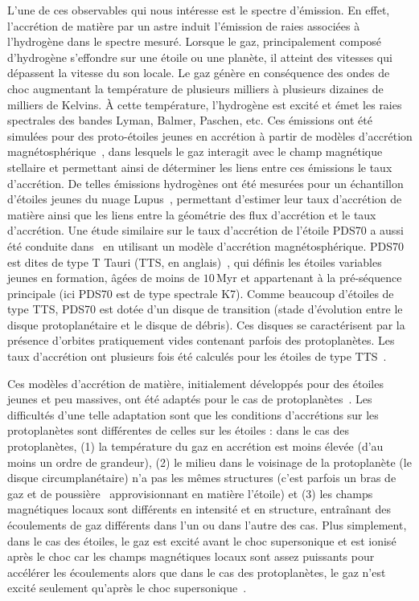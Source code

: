 L'une de ces observables qui nous intéresse est le spectre d'émission. En effet, l'accrétion de matière par un astre induit l'émission de raies associées à l'hydrogène dans le spectre mesuré. Lorsque le gaz, principalement composé d'hydrogène s'effondre sur une étoile ou une planète, il atteint des vitesses qui dépassent la vitesse du son locale. Le gaz génère en conséquence des ondes de choc augmentant la température de plusieurs milliers à plusieurs dizaines de milliers de Kelvins. À cette température, l'hydrogène est excité et émet les raies spectrales des bandes Lyman, Balmer, Paschen, etc. Ces émissions ont été simulées pour des proto-étoiles jeunes en accrétion à partir de modèles d'accrétion magnétosphérique~\citep{muzerolle2001, natta2004, espaillat2008}, dans lesquels le gaz interagit avec le champ magnétique stellaire et permettant ainsi de déterminer les liens entre ces émissions le taux d'accrétion. De telles émissions hydrogènes ont été mesurées pour un échantillon d'étoiles jeunes du nuage Lupus~\citep{alcala2014, alcala2017}, permettant d'estimer leur taux d'accrétion de matière ainsi que les liens entre la géométrie des flux d'accrétion et le taux d'accrétion. Une étude similaire sur le taux d'accrétion de l'étoile PDS70 a aussi été conduite dans~\cite{thanathibodee2020} en utilisant un modèle d'accrétion magnétosphérique. PDS70 est dites de type T Tauri (\ac{TTS}, en anglais)~\citep{appenzeller1989}, qui définis les étoiles variables jeunes en formation, âgées de moins de $10 \,$Myr et appartenant à la pré-séquence principale (ici PDS70 est de type spectrale K7). Comme beaucoup d'étoiles de type \ac{TTS}, PDS70 est dotée d'un disque de transition (stade d'évolution entre le disque protoplanétaire et le disque de débris). Ces disques se caractérisent par la présence d'orbites pratiquement vides contenant parfois des protoplanètes. Les taux d'accrétion ont plusieurs fois été calculés pour les étoiles de type \ac{TTS}~\citep{natta2004, rigliaco2012, ingleby2013}.

Ces modèles d'accrétion de matière, initialement développés pour des étoiles jeunes et peu massives, ont été adaptés pour le cas de protoplanètes~\citep{aoyama2018, thanathibodee2019}. Les difficultés d'une telle adaptation sont que les conditions d'accrétions sur les protoplanètes sont différentes de celles sur les étoiles : dans le cas des protoplanètes, (1) la température du gaz en accrétion est moins élevée (d'au moins un ordre de grandeur), (2) le milieu dans le voisinage de la protoplanète (le disque circumplanétaire) n'a pas les mêmes structures (c'est parfois un bras de gaz et de poussière~\citep{boccaletti2020} approvisionnant en matière l'étoile) et (3) les champs magnétiques locaux sont différents en intensité et en structure, entraînant des écoulements de gaz différents dans l'un ou dans l'autre des cas. Plus simplement, dans le cas des étoiles, le gaz est excité avant le choc supersonique et est ionisé après le choc car les champs magnétiques locaux sont assez puissants pour accélérer les écoulements alors que dans le cas des protoplanètes, le gaz n'est excité seulement qu'après le choc supersonique~\citep{aoyama2019}.

